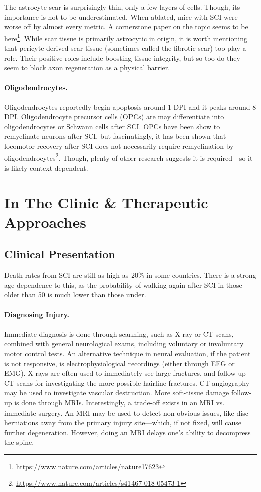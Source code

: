 \documentclass[12pt]{report}
\begin{document}
The astrocyte scar is surprisingly thin, only a few layers of cells. Though, its importance is not to be underestimated. When ablated, mice with SCI were worse off by almost every metric. A cornerstone paper on the topic seems to be here\footnote{\url{https://www.nature.com/articles/nature17623}}. While scar tissue is primarily astrocytic in origin, it is worth mentioning that pericyte derived scar tissue (sometimes called the fibrotic scar) too play a role. Their positive roles include boosting tissue integrity, but so too do they seem to block axon regeneration as a physical barrier. 

\subsubsection{Oligodendrocytes.}
Oligodendrocytes reportedly begin apoptosis around 1 DPI and it peaks around 8 DPI. Oligodendrocyte precursor cells (OPCs) are may differentiate into oligodendrocytes or Schwann cells after SCI. OPCs have been show to remyelinate neurons after SCI, but fascinatingly, it has been shown that locomotor recovery after SCI does not necessarily require remyelination by oligodendrocytes\footnote{\url{https://www.nature.com/articles/s41467-018-05473-1}}. Though, plenty of other research suggests it is required---so it is likely context dependent. 



\chapter{In The Clinic \& Therapeutic Approaches}

\section{Clinical Presentation}
Death rates from SCI are still as high as 20\% in some countries. There is a strong age dependence to this, as the probability of walking again after SCI in those older than 50 is much lower than those under.

\subsubsection{Diagnosing Injury.}
Immediate diagnosis is done through scanning, such as X-ray or CT scans, combined with general neurological exams, including voluntary or involuntary motor control tests. An alternative technique in neural evaluation, if the patient is not responsive, is electrophysiological recordings (either through EEG or EMG). X-rays are often used to immediately see large fractures, and follow-up CT scans for investigating the more possible hairline fractures. CT angiography may be used to investigate vascular destruction. More soft-tissue damage follow-up is done through MRIs. Interestingly, a trade-off exists in an MRI vs. immediate surgery. An MRI may be used to detect non-obvious issues, like disc herniations away from the primary injury site---which, if not fixed, will cause further degeneration. However, doing an MRI delays one's ability to decompress the spine.\newline
\end{document}
